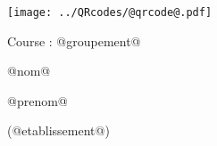 \Huge

\begin{block} %



\vspace{0.5cm}


\begin{minipage}{0.48\linewidth}
\texttt{[image: ../QRcodes/@qrcode@.pdf]}

\vspace{0.5cm}

	Course : @groupement@
\end{minipage}
\begin{minipage}{0.5\linewidth}
{}\hfill {}
{}\hfill {}

\bigskip

\begin{center}
@nom@

@prenom@

(@etablissement@)
\end{center}
\end{minipage}


\end{block}

\vfill
